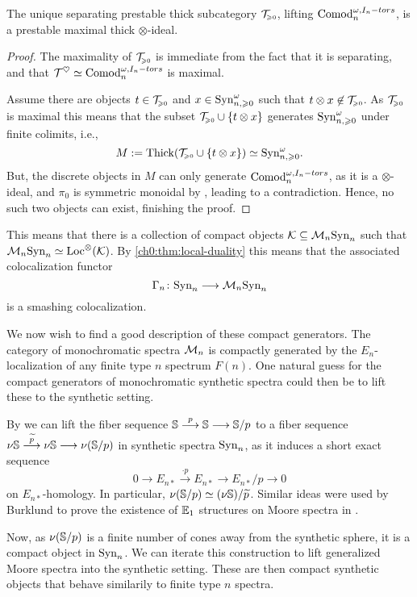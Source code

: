 \begin{lemma}
    The unique separating prestable thick subcategory $\T\geqz$, lifting $\Comod_n^{\omega, I_n-tors}$, is a prestable maximal thick $\otimes$-ideal. 
\end{lemma}
\begin{proof}
    The maximality of $\T\geqz$ is immediate from the fact that it is separating, and that $\T^\heart \simeq \Comod_n^{\omega, I_n-tors}$ is maximal. 

    Assume there are objects $t\in \T\geqz$ and $x \in \Syn_{n, \geq 0}^\omega$ such that $t \otimes x \not\in \T\geqz$. As $\T\geqz$ is maximal this means that the subset $\T\geqz \cup \{t \otimes x\}$ generates $\Syn_{n, \geq 0}^\omega$ under finite colimits, i.e., 
    \[M:= \mathrm{Thick}(\T\geqz \cup \{t \otimes x\}) \simeq \Syn_{n, \geq 0}^\omega.\]
    But, the discrete objects in $M$ can only generate $\Comod_n^{\omega, I_n-tors}$, as it is a $\otimes$-ideal, and $\pi_0$ is symmetric monoidal by \cite[A.12]{antieau_nikolaus_2020}, leading to a contradiction. Hence, no such two objects can exist, finishing the proof. 
\end{proof}

This means that there is a collection of compact objects $\K \subseteq \Mn\Syn_n$ such that $\Mn\Syn_n \simeq \Loc^\otimes (\K)$. By \cref{ch0:thm:local-duality} this means that the associated colocalization functor
\[\Gamma_n\: \Syn_n \to \Mn\Syn_n\]
is a smashing colocalization. 

We now wish to find a good description of these compact generators. The category of monochromatic spectra $\Mn$ is compactly generated by the $E_n$-localization of any finite type $n$ spectrum $F(n)$. One natural guess for the compact generators of monochromatic synthetic spectra could then be to lift these to the synthetic setting. 

\begin{construction}
    By \cite[4.23]{pstragowski_2022} we can lift the fiber sequence $\S\overset{p}\to\S\to\S/p$ to a fiber sequence $\nu \S \overset{\widetilde{p}}\to \nu \S\to \nu (\S/p)$ in synthetic spectra $\Syn_n$, as it induces a short exact sequence 
    \[0\to E_{n*} \overset{\cdot p}\to E_{n*}\to E_{n*}/p\to 0\]
    on $E_{n*}$-homology. In particular, $\nu (\S/p)\simeq (\nu \S)/\widetilde{p}$. Similar ideas were used by Burklund to prove the existence of $\E_1$ structures on Moore spectra in \cite{burklund_2022}. 
    
    Now, as $\nu (\S/p)$ is a finite number of cones away from the synthetic sphere, it is a compact object in $\Syn_n$. We can iterate this construction to lift generalized Moore spectra into the synthetic setting. These are then compact synthetic objects that behave similarily to finite type $n$ spectra. 
\end{construction}

